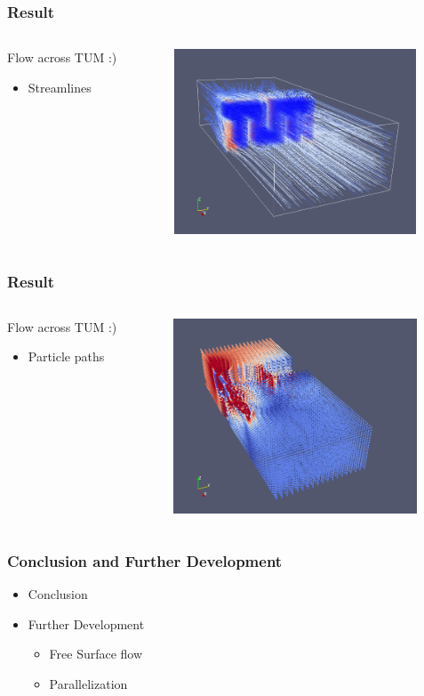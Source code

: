 \documentclass{beamer}
\begin{document}
\begin{frame}
\frametitle{Result}
\begin{columns}
\begin{column}{0.33\textwidth}
Flow across TUM :)
\begin{itemize}
\item Streamlines
\end{itemize}
\end{column}
\begin{column}{0.66\textwidth}
\includegraphics[height=5.5cm]{TUMFlow.png}
\end{column}
\end{columns}
\end{frame}

\begin{frame}
\frametitle{Result}
\begin{columns}
\begin{column}{0.33\textwidth}
Flow across TUM :)
\begin{itemize}
\item Particle paths
\end{itemize}
\end{column}
\begin{column}{0.66\textwidth}
\includegraphics[height=5.8cm]{TUM-Particles.png}
\end{column}
\end{columns}
\end{frame}

\begin{frame}
\frametitle{Conclusion and Further Development}

\begin{itemize}
\item Conclusion
\item Further Development
\begin{itemize}
\item Free Surface flow
\item Parallelization
\end{itemize}
\end{itemize}
\end{frame}
\end{document}
